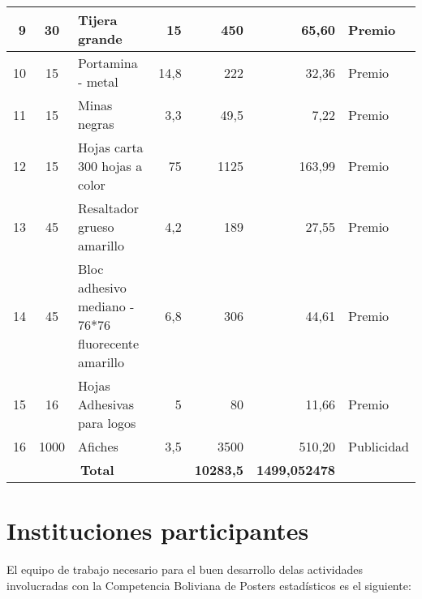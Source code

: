 \documentclass{article}
\begin{document}
\begin{table}[htbp]
{\begin{tabular}{|cccc|r|r|r}
    \midrule
    \multicolumn{1}{|r|}{9} & \multicolumn{1}{c|}{30} & \multicolumn{1}{l|}{Tijera grande} & \multicolumn{1}{r|}{15} & 450   & 65,60 & \multicolumn{1}{l|}{Premio} \\
    \midrule
    \multicolumn{1}{|r|}{10} & \multicolumn{1}{c|}{15} & \multicolumn{1}{l|}{Portamina - metal} & \multicolumn{1}{r|}{14,8} & 222   & 32,36 & \multicolumn{1}{l|}{Premio} \\
    \midrule
    \multicolumn{1}{|r|}{11} & \multicolumn{1}{c|}{15} & \multicolumn{1}{l|}{Minas negras} & \multicolumn{1}{r|}{3,3} & 49,5  & 7,22  & \multicolumn{1}{l|}{Premio} \\
    \midrule
    \multicolumn{1}{|r|}{12} & \multicolumn{1}{c|}{15} & \multicolumn{1}{l|}{Hojas carta 300 hojas a color} & \multicolumn{1}{r|}{75} & 1125  & 163,99 & \multicolumn{1}{l|}{Premio} \\
    \midrule
    \multicolumn{1}{|r|}{13} & \multicolumn{1}{c|}{45} & \multicolumn{1}{l|}{Resaltador grueso amarillo} & \multicolumn{1}{r|}{4,2} & 189   & 27,55 & \multicolumn{1}{l|}{Premio} \\
    \midrule
    \multicolumn{1}{|r|}{14} & \multicolumn{1}{c|}{45} & \multicolumn{1}{l|}{Bloc adhesivo mediano - 76*76 fluorecente amarillo} & \multicolumn{1}{r|}{6,8} & 306   & 44,61 & \multicolumn{1}{l|}{Premio} \\
    \midrule
    \multicolumn{1}{|r|}{15} & \multicolumn{1}{c|}{16} & \multicolumn{1}{l|}{Hojas Adhesivas para logos} & \multicolumn{1}{r|}{5} & 80    & 11,66 & \multicolumn{1}{l|}{Premio} \\
    \midrule
    \multicolumn{1}{|r|}{16} & \multicolumn{1}{c|}{1000} & \multicolumn{1}{l|}{Afiches} & \multicolumn{1}{r|}{3,5} & 3500  & 510,20 & \multicolumn{1}{l|}{Publicidad} \\
    \midrule
    \multicolumn{4}{|c|}{\textbf{Total}} & \textbf{10283,5} & \textbf{1499,052478} &  \\
\cmidrule{1-6}    \end{tabular}}%
  \label{tab:addlabel}%
\end{table}%



\section{Instituciones participantes}

El equipo de trabajo necesario para el buen desarrollo delas actividades involucradas con la Competencia Boliviana de Posters estadísticos es el siguiente: \\
\end{document}
